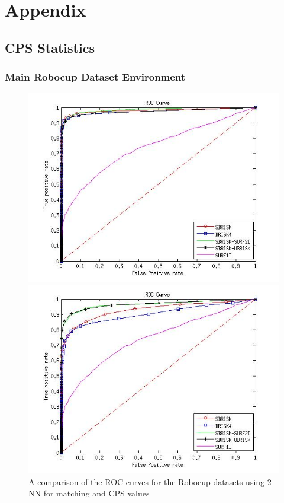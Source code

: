 \chapter{Appendix}
\label{app:appendixa}


\section{CPS Statistics}
\label{app:cps}

\subsection{Main Robocup Dataset Environment}
\label{app:mrd}

\begin{figure}[ht!]
\begin{minipage}[b]{0.5\linewidth}
\includegraphics[scale=0.4]{../Drawings/RobocupDataset/ROC_General_KNN_consistent.jpg}
\caption{A comparison of the ROC curves for the Robocup datasets using 2-NN for matching and CPS values}
\label{fig:compareKNNConsist}
\end{minipage}
\hspace{0.5cm}
\begin{minipage}[b]{0.5\linewidth}
\includegraphics[scale=0.4]{../Drawings/RobocupDataset/ROC_General_Hamming_consistent.jpg}

\end{minipage}
\end{figure}
